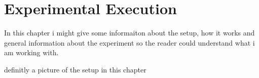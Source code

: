 \chapter{Experimental Execution}
\label{cha:Durchführung}

In this chapter i might give some informaiton about the setup, how it works and general information about the experiment so the reader could understand what i am working with.

definitly a picture of the setup in this chapter